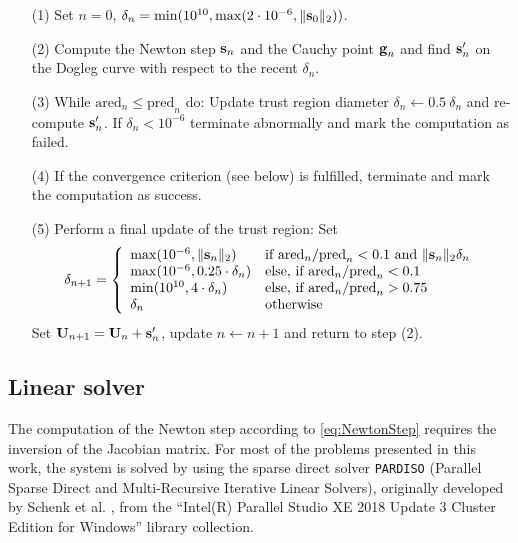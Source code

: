 \begin{itemize}
	\item[(1)]
	Set $n=0$, $\delta_n = \min(10^{10}, \max(2 \cdot 10^{-6}, \| \textbf{s}_0 \|_2 ))$.	
	\item[(2)]
	Compute the Newton step $\textbf{s}_n$ and the Cauchy point  $\textbf{g}_n$ and
	find $\textbf{s}'_n$ on the Dogleg curve with respect to the recent $\delta_n$.	
	\item[(3)]
	While $\textrm{ared}_n \leq \textrm{pred}_n$ do:
	Update trust region diameter $\delta_n \leftarrow 0.5 \ \delta_n$
	and re-compute $\textbf{s}'_n$.
	If $\delta_n < 10^{-6}$ terminate abnormally and mark the computation as failed.	
	\item[(4)]
	If the convergence criterion (see below) is fulfilled, terminate and mark the computation as success.	
	\item[(5)]
	Perform a final update of the trust region: Set
	\[
	\delta_{n+1} = \left\{ \begin{array}{ll}
		\max( 10^{-6}, \| \textbf{s}_n \|_2 ) & \text{if } \textrm{ared}_n / \textrm{pred}_n < 0.1 \text{ and } \| \textbf{s}_n \|_2 \delta_n \\
		\max( 10^{-6}, 0.25 \cdot \delta_n )    & \text{else, if } \textrm{ared}_n / \textrm{pred}_n < 0.1                                        \\
		\min( 10^{10}, 4 \cdot \delta_n )       & \text{else, if } \textrm{ared}_n / \textrm{pred}_n > 0.75                                       \\
		\delta_{n}                              & \text{otherwise}                                                                                \\
	\end{array} \right.
	\]
	Set $\textbf{U}_{n+1} = \textbf{U}_{n} + \textbf{s}'_{n} $, update $n \leftarrow n + 1$ and return to step (2).	
\end{itemize}
\subsection{Linear solver}\label{ssec:LinearSolver}

The computation of the Newton step according to \cref{eq:NewtonStep} requires the inversion of the Jacobian matrix.  For most of the problems presented in this work, the system is solved by using the sparse direct solver \texttt{PARDISO} (Parallel Sparse Direct and Multi-Recursive Iterative Linear Solvers), originally developed by Schenk et al.  \parencite{schenkEfficientSparseLU2000,schenkTwolevelDynamicScheduling2002,schenkSolvingUnsymmetricSparse2004a},
from the ``Intel(R) Parallel Studio XE 2018 Update 3 Cluster Edition for Windows'' library collection.

